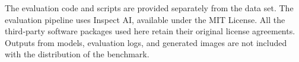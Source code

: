 \documentclass{article}
\begin{document}
The evaluation code and scripts are provided separately from the data set. The evaluation pipeline uses Inspect AI, available under the MIT License. All the third-party software packages used here retain their original license agreements. Outputs from models, evaluation logs, and generated images are not included with the distribution of the benchmark.

\clearpage
% 
\end{document}
